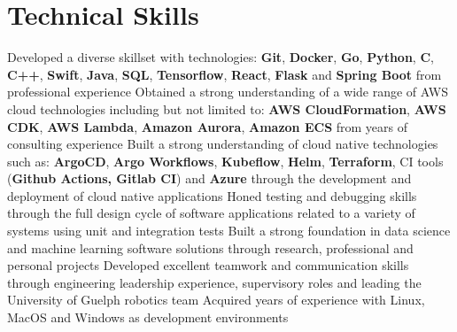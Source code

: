 \section{Technical Skills}
\begin{entries}
	\ib Developed a diverse skillset with technologies: \textbf{Git}, \textbf{Docker}, \textbf{Go},
	\textbf{Python}, \textbf{C}, \textbf{C++}, \textbf{Swift}, \textbf{Java}, \textbf{SQL}, \textbf{Tensorflow}, \textbf{React},
	\textbf{Flask} and \textbf{Spring Boot} from professional experience
	\ib Obtained a strong understanding of a wide range of AWS cloud technologies including but not limited to:
        \textbf{AWS CloudFormation}, \textbf{AWS CDK}, \textbf{AWS Lambda},
        \textbf{Amazon Aurora}, \textbf{Amazon ECS} from years of consulting experience
	\ib Built a strong understanding of cloud native technologies such as: \textbf{ArgoCD}, \textbf{Argo Workflows},
	\textbf{Kubeflow}, \textbf{Helm},
	\textbf{Terraform}, CI tools (\textbf{Github Actions, Gitlab CI}) and \textbf{Azure} through the development and deployment
	of cloud native applications
	\ib Honed testing and debugging skills through the full design cycle of software applications related
	to a variety of systems using unit and integration tests
	\ib Built a strong foundation in data science and machine learning software solutions through
	research, professional and personal projects
	\ib Developed excellent teamwork and communication skills through engineering leadership experience,
	supervisory roles and leading the University of Guelph robotics team
	\ib Acquired years of experience with Linux, MacOS and Windows as development environments
\end{entries}

\sectionsep
